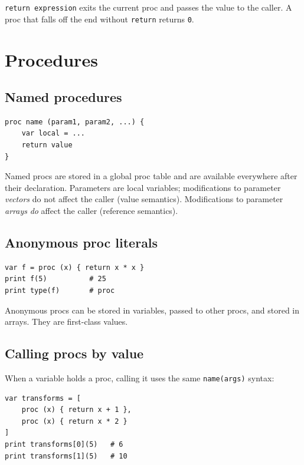 \documentclass[11pt,a4paper]{article}
\newcommand{\musil}[1]{\lstinline[style=musilinline]{#1}}
\begin{document}
\musil{return expression} exits the current proc and passes the value to the
caller. A proc that falls off the end without \musil{return} returns \texttt{0}.

\section{Procedures}
\label{sec:procs}

\subsection{Named procedures}

\begin{lstlisting}
proc name (param1, param2, ...) {
    var local = ...
    return value
}
\end{lstlisting}

Named procs are stored in a global proc table and are available everywhere
after their declaration. Parameters are local variables; modifications to
parameter \emph{vectors} do not affect the caller (value semantics).
Modifications to parameter \emph{arrays} \emph{do} affect the caller (reference
semantics).

\subsection{Anonymous proc literals}

\begin{lstlisting}
var f = proc (x) { return x * x }
print f(5)          # 25
print type(f)       # proc
\end{lstlisting}

Anonymous procs can be stored in variables, passed to other procs, and stored
in arrays. They are first-class values.

\subsection{Calling procs by value}

When a variable holds a proc, calling it uses the same \musil{name(args)} syntax:

\begin{lstlisting}
var transforms = [
    proc (x) { return x + 1 },
    proc (x) { return x * 2 }
]
print transforms[0](5)   # 6
print transforms[1](5)   # 10
\end{lstlisting}
\end{document}
